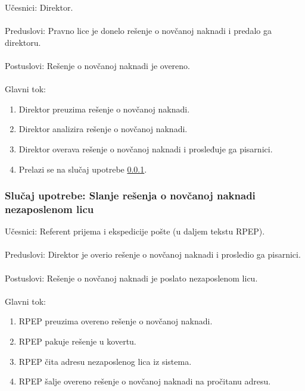 \noindent Učesnici: Direktor.
\\
\\ Preduslovi: Pravno lice je donelo rešenje o novčanoj naknadi i predalo ga direktoru.
\\
\\ Postuslovi: Rešenje o novčanoj naknadi je overeno.
\\
\\ Glavni tok:
\begin{enumerate}
\item Direktor preuzima rešenje o novčanoj naknadi.
\item Direktor analizira rešenje o novčanoj naknadi.
\item Direktor overava rešenje o novčanoj naknadi i prosleđuje ga pisarnici.
\item Prelazi se na slu\v caj upotrebe \ref{su: pisarnica}.
\end{enumerate}


\subsubsection{Slu\v caj upotrebe: Slanje rešenja o novčanoj naknadi nezaposlenom licu}
\label{su: pisarnica}

\noindent Učesnici: Referent prijema i ekspedicije pošte (u daljem tekstu RPEP).
\\
\\ Preduslovi: Direktor je overio rešenje o novčanoj naknadi i prosledio ga pisarnici.
\\
\\ Postuslovi: Rešenje o novčanoj naknadi je poslato nezaposlenom licu.
\\
\\ Glavni tok:
\begin{enumerate}
\item RPEP preuzima overeno rešenje o novčanoj naknadi.
\item RPEP pakuje rešenje u kovertu.
\item RPEP čita adresu nezaposlenog lica iz sistema.
\item RPEP šalje overeno rešenje o novčanoj naknadi na pročitanu adresu.
\end{enumerate}

